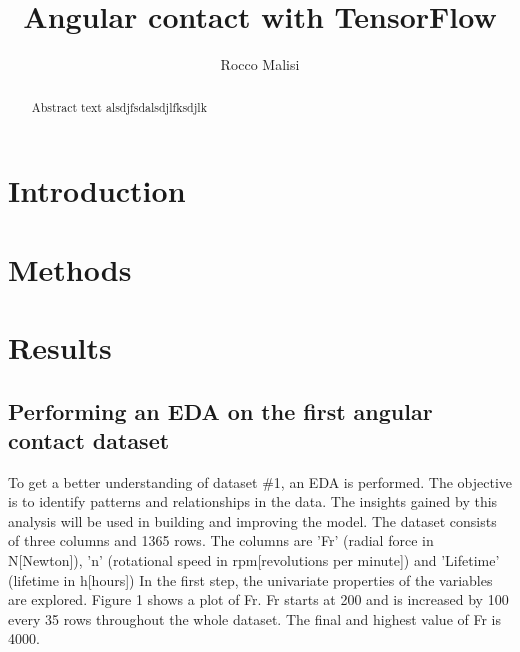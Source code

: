 \documentclass[letterpaper,10pt]{article}
\title{Angular contact with TensorFlow}
\author{Rocco Malisi}
\begin{document}
	\maketitle
	\newpage
	
	\begin{abstract}
		Abstract text alsdjfsdalsdjlfksdjlk
	\end{abstract}
	\newpage
	
	\tableofcontents
	\newpage
	
	\section{Introduction}
	\section{Methods}
	\section{Results}
	\subsection{Performing an EDA on the first angular contact dataset}
	To get a better understanding of dataset \#1, an EDA is performed. The objective is to identify patterns and relationships in the data. The insights gained by this analysis will be used in building and improving the model.\newline
	The dataset consists of three columns and 1365 rows. The columns are 'Fr' (radial force in N[Newton]), 'n' (rotational speed in rpm[revolutions per minute]) and 'Lifetime' (lifetime	in h[hours]) \newline
	In the first step, the univariate properties of the variables are explored.
	Figure 1 shows a plot of Fr. Fr starts at 200 and is increased by 100 every 35 rows throughout the whole dataset. The final and highest value of Fr is 4000.
	
	     
	
\end{document}

